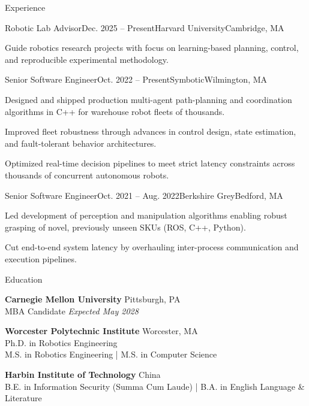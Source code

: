 \documentclass{resume}
\begin{document}
\begin{rSection}{Experience}

\begin{rSubsection}{Robotic Lab Advisor}{Dec. 2025 -- Present}{Harvard University}{Cambridge, MA}
\item Guide robotics research projects with focus on learning-based planning, control, and reproducible experimental methodology.
\end{rSubsection}

\begin{rSubsection}{Senior Software Engineer}{Oct. 2022 -- Present}{Symbotic}{Wilmington, MA}
\item Designed and shipped production multi-agent path-planning and coordination algorithms in C++ for warehouse robot fleets of thousands.
\item Improved fleet robustness through advances in control design, state estimation, and fault-tolerant behavior architectures.
\item Optimized real-time decision pipelines to meet strict latency constraints across thousands of concurrent autonomous robots.
\end{rSubsection}

\begin{rSubsection}{Senior Software Engineer}{Oct. 2021 -- Aug. 2022}{Berkshire Grey}{Bedford, MA}
\item Led development of perception and manipulation algorithms enabling robust grasping of novel, previously unseen SKUs (ROS, C++, Python).
\item Cut end-to-end system latency by overhauling inter-process communication and execution pipelines.
\end{rSubsection}

\end{rSection}

\begin{rSection}{Education}

{\bf Carnegie Mellon University} \hfill Pittsburgh, PA \\
MBA Candidate \hfill {\em Expected May 2028}

{\bf Worcester Polytechnic Institute} \hfill Worcester, MA \\
Ph.D. in Robotics Engineering \\
M.S. in Robotics Engineering | M.S. in Computer Science

{\bf Harbin Institute of Technology} \hfill China \\
B.E. in Information Security (Summa Cum Laude) | B.A. in English Language \& Literature

\end{rSection}
\end{document}
